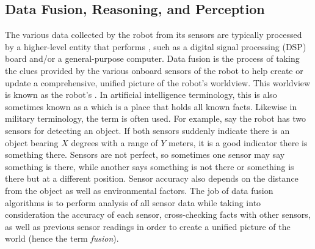 \subsection{Data Fusion, Reasoning, and Perception}
The various data collected by the robot from its sensors are typically processed by a higher-level entity that performs , such as a digital signal processing (DSP) board and/or a general-purpose computer. Data fusion is the process of taking the clues provided by the various onboard sensors of the robot to help create or update a comprehensive, unified picture of the robot's worldview. This worldview is known as the robot's . In artificial intelligence terminology, this is also sometimes known as a  which is a place that holds all known facts. Likewise in military terminology, the term  is often used. For example, say the robot has two sensors for detecting an object. If both sensors suddenly indicate there is an object bearing $X$ degrees with a range of $Y$ meters, it is a good indicator there is something there. Sensors are not perfect, so sometimes one sensor may say something is there, while another says something is not there or something is there but at a different position. Sensor accuracy also depends on the distance from the object as well as environmental factors. The job of data fusion algorithms is to perform analysis of all sensor data while taking into consideration the accuracy of each sensor, cross-checking facts with other sensors, as well as previous sensor readings in order to create a unified picture of the world (hence the term \textit{fusion}).

